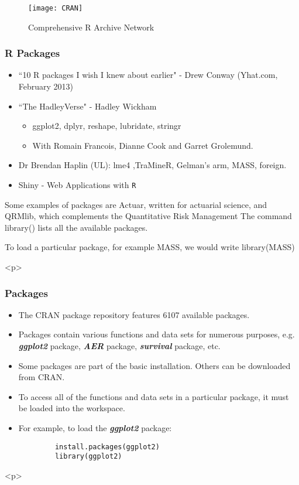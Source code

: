 
 		\begin{figure}
 			\centering
 			\texttt{[image: CRAN]}
 			\caption{Comprehensive R Archive Network}
 			
 		\end{figure}
 		
 		

 		\frametitle{R Packages}
 		
 		\begin{itemize}
 			\item ``10 R packages I wish I knew about earlier" - Drew Conway (Yhat.com, February 2013)
 			\bigskip \item ``The HadleyVerse" - Hadley Wickham
 			\begin{itemize}
 				
 				\item  ggplot2, dplyr, reshape, lubridate, stringr
 				
 				\item  With Romain Francois, Dianne Cook and Garret Grolemund.
 			\end{itemize}
 			\bigskip
 			\item Dr Brendan Haplin (UL): lme4 ,TraMineR, Gelman's arm, MASS, foreign. 
 			\bigskip
 			\item Shiny - Web Applications with \texttt{R}
 		\end{itemize}

 		
 		
 		
 		Some examples of packages are Actuar, written for actuarial science, and
 		QRMlib, which complements the Quantitative Risk Management The command library()
 		lists all the available packages. 
 		
 		To load a particular package, for example MASS, we would
 		write
 		library(MASS)
 		
<p>

 		
 		\frametitle{Packages}
 		\begin{itemize}
 			\item The CRAN package repository features 6107 available packages. 
 			\item Packages contain
 			various functions and data sets for numerous purposes, e.g.
 			\textbf{\textit{ggplot2}} package, \textbf{\textit{AER}} package, \textbf{\textit{survival}} package, etc.
 			\item Some packages are part of the basic installation. Others can be
 			downloaded from CRAN.
 			\item To access all of the functions and data sets in a particular package,
 			it must be loaded into the workspace. 
 			\item For example, to load the
 			\textbf{\textit{ggplot2}} package:
 		\end{itemize}
 		\begin{framed}
 			\begin{verbatim}
 			install.packages(ggplot2)
 			library(ggplot2)
 			\end{verbatim}
 		\end{framed}
<p>

